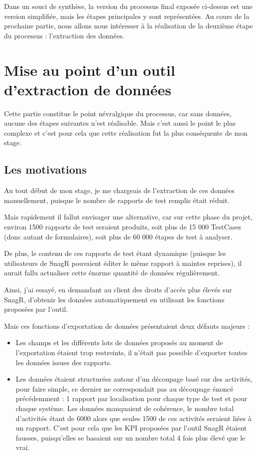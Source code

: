 Dans un souci de synthèse, la version du processus final exposée ci-dessus est une version simplifiée, mais les étapes principales y sont représentées.
Au cours de la prochaine partie, nous allons nous intéresser à la réalisation de la deuxième étape du processus : l'extraction des données.

\newpage
\section{Mise au point d'un outil d'extraction de données }
Cette partie constitue le point névralgique du processus, car sans données, aucune des étapes suivantes n'est réalisable. Mais c'est aussi le point le plus complexe et c'est pour cela que cette réalisation fut la plus conséquente de mon stage.
\subsection{Les motivations}
Au tout début de mon stage, je me chargeais de l'extraction de ces données manuellement, puisque le nombre de rapports de test remplis était réduit.

Mais rapidement il fallut envisager une alternative, car sur cette phase du projet, environ 1500 rapports de test seraient produits, soit plus de 15 000 \gls{TestCases} (donc autant de formulaires), soit plus de 60 000 étapes de test à analyser.

De plus, le contenu de ces rapports de test étant dynamique (puisque les utilisateurs de \gls{SnagR} pouvaient éditer le même rapport à maintes reprises), il aurait fallu actualiser cette énorme quantité de données régulièrement.

Ainsi, j'ai essayé, en demandant au client des droits d'accès plus élevés sur \gls{SnagR}, d'obtenir les données automatiquement en utilisant les fonctions proposées par l'outil.

Mais ces fonctions d'exportation de données présentaient deux défauts majeurs :
\begin{itemize}
\item Les champs et les différents lots de données proposés au moment de l'exportation étaient trop restreints, il n'était pas possible d'exporter toutes les données issues des rapports.
\item Les données étaient structurées autour d'un découpage basé sur des activités, pour faire simple, ce dernier ne correspondait pas au découpage énoncé précédemment : 1 rapport par localisation pour chaque type de test et pour chaque système. Les données manquaient de cohérence, le nombre total d'activités étant de 6000 alors que seules 1500 de ces activités seraient liées à un rapport. C'est pour cela que les \gls{KPI} proposées par l'outil \gls{SnagR} étaient fausses, puisqu'elles se basaient sur un nombre total 4 fois plus élevé que le vrai.
\end{itemize}

